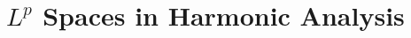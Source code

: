 \documentclass[../../main.tex]{subfiles}
\begin{document}
\chapter{\(L^p\) Spaces in Harmonic Analysis}
\end{document}
